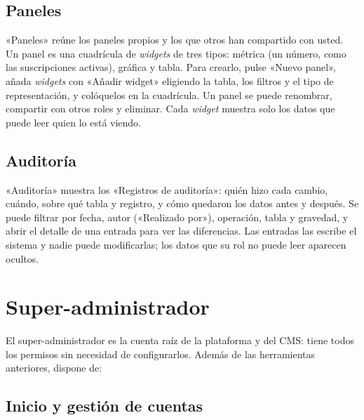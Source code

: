 \subsection{Paneles}
\label{sec:ug-paneles}

«Paneles» reúne los paneles propios y los que otros han compartido con
usted. Un panel es una cuadrícula de \textit{widgets} de tres tipos: métrica
(un número, como las suscripciones activas), gráfica y tabla. Para crearlo,
pulse «Nuevo panel», añada \textit{widgets} con «Añadir widget» eligiendo la
tabla, los filtros y el tipo de representación, y colóquelos en la cuadrícula.
Un panel se puede renombrar, compartir con otros roles y eliminar. Cada
\textit{widget} muestra solo los datos que puede leer quien lo está viendo.

\subsection{Auditoría}
\label{sec:ug-auditoria}

«Auditoría» muestra los «Registros de auditoría»: quién hizo cada cambio,
cuándo, sobre qué tabla y registro, y cómo quedaron los datos antes y después.
Se puede filtrar por fecha, autor («Realizado por»), operación, tabla y
gravedad, y abrir el detalle de
una entrada para ver las diferencias. Las entradas las escribe el sistema y
nadie puede modificarlas; los datos que su rol no puede leer aparecen
ocultos.

\section{Super-administrador}
\label{sec:ug-superadmin}

El super-administrador es la cuenta raíz de la plataforma y del CMS: tiene
todos los permisos sin necesidad de configurarlos. Además de las herramientas
anteriores, dispone de:

\subsection{Inicio y gestión de cuentas}

